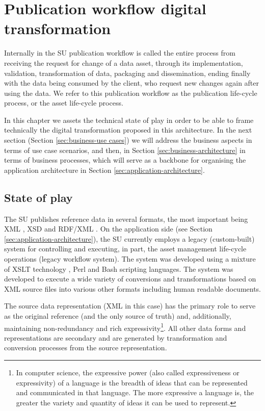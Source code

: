 \chapter{Publication workflow digital transformation}
\label{sec:context}
    
    Internally in the SU publication workflow is called the entire process from receiving the request for change of a data asset, through its implementation, validation, transformation of data, packaging and dissemination, ending finally with the data being consumed by the client, who request new changes again after using the data. We refer to this publication workflow as the publication life-cycle process, or the asset life-cycle process.
    
    In this chapter we assets the technical state of play in order to be able to frame technically the digital transformation proposed in this architecture. In the next section (Section \ref{sec:business-use cases}) we will address the business aspects in terms of use case scenarios, and then, in Section \ref{sec:business-architecture} in terms of business processes, which will serve as a backbone for organising the application architecture in Section \ref{sec:application-architecture}.

	\section{State of play}
	The SU publishes reference data in several formats, the most important being XML \citep{xml1-spec}, XSD \citep{xsd1.1-spec} and RDF/XML \citep{rdf-xml-Beckett:04:RSS,rdf-xml-Schreiber:14:RXS}. On the application side (see Section \ref{sec:application-architecture}), the SU currently employs a legacy (custom-built) system for controlling and executing, in part, the asset management life-cycle operations (legacy workflow system). The system was developed using a mixture of XSLT technology \cite{xslt3-Kay}, Perl and Bash scripting languages. The system was developed to execute a wide variety of conversions and transformations based on XML source files into various other formats including human readable documents.
	 
	The source data representation (XML in this case) has the primary role to serve as the original reference (and the only source of truth) and, additionally, maintaining non-redundancy and rich expressivity\footnote{In computer science, the expressive power (also called expressiveness or expressivity) of a language is the breadth of ideas that can be represented and communicated in that language. The more expressive a language is, the greater the variety and quantity of ideas it can be used to represent.}. All other data forms and representations are secondary and are generated by transformation and conversion processes from the source representation.
	 
